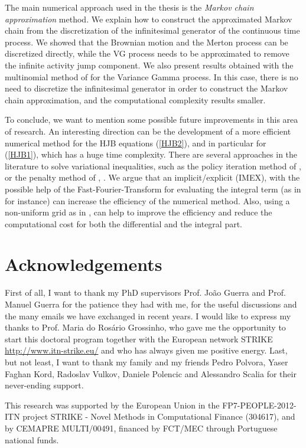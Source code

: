 The main numerical approach used in the thesis is the \emph{Markov chain approximation} method. We explain how to construct the approximated Markov chain from the 
discretization of the infinitesimal generator of the continuous time process.
We showed that the Brownian motion and the Merton process can be discretized directly, 
while the VG process needs to be approximated to remove the infinite activity jump component.
We also present results obtained with the multinomial method of \cite{YaPr01} for the Variance Gamma process. In this case, there is no need to discretize the infinitesimal
generator in order to construct the Markov chain approximation, and the computational complexity results smaller. 


To conclude, we want to mention some possible future improvements in this area of research. 
An interesting direction can be the development of a more efficient numerical method for the HJB equations (\ref{HJB2}), and in particular for (\ref{HJB1}), 
which has a huge time complexity.
There are several approaches in the literature to solve variational inequalities, such as the policy iteration method of \cite{FoHu12a}, or the penalty method of 
\cite{FoHu12b}, \cite{Song14}.
We argue that an implicit/explicit (IMEX), with the possible help of the Fast-Fourier-Transform for evaluating the integral term (as in \cite{AnAn00} for instance) 
can increase the efficiency of the numerical method.
Also, using a non-uniform grid as in \cite{Haentjens13}, can help to improve the efficiency 
and reduce the computational cost for both the differential and the integral part.






\section*{Acknowledgements}

First of all, I want to thank my PhD supervisors Prof. João Guerra and Prof. Manuel Guerra for the
patience they had with me, for the useful discussions and the many emails we have exchanged in recent years.
I would like to express my thanks to Prof. Maria do Rosário Grossinho, who gave me the opportunity to start
this doctoral program together with the European network STRIKE \url{http://www.itn-strike.eu/} and who has always 
given me positive energy.
Last, but not least, I want to thank my family and my friends Pedro Polvora, Yaser Faghan Kord, Radoslav Vulkov, 
Daniele Polencic and Alessandro Scalia for their never-ending support.

This research was supported by the European Union in the FP7-PEOPLE-2012-ITN project STRIKE - 
Novel Methods in Computational Finance (304617), and by CEMAPRE
MULTI/00491, financed by FCT/MEC through Portuguese national funds.
